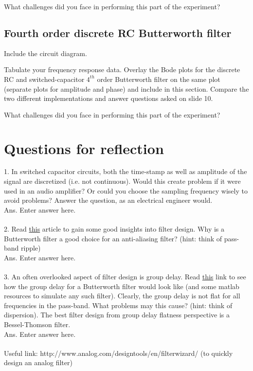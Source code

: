 \documentclass[12pt]{article}
\begin{document}
What challenges did you face in performing this part of the experiment?

\subsection{Fourth order discrete RC Butterworth filter}

Include the circuit diagram.

Tabulate your frequency response data. Overlay the Bode plots for the discrete RC and switched-capacitor $4^{th}$ order Butterworth filter on the same plot (separate plots for amplitude and phase) and include in this section. Compare the two different implementations and answer questions asked on slide 10.

What challenges did you face in performing this part of the experiment?

\section{Questions for reflection}

1. In switched capacitor circuits, both the time-stamp as well as amplitude of the signal are discretized (i.e. not continuous). Would this create problem if it were used in an audio amplifier? Or could you choose the sampling frequency wisely to avoid problems? Answer the question, as an electrical engineer would.\\
Ans. Enter answer here.
\\\\
2. Read \href{http://www.analog.com/en/analog-dialogue/articles/practical-filter-design-precision-adcs.html}{this} article to gain some good insights into filter design. Why is a Butterworth filter a good choice for an anti-aliasing filter? (hint: think of pass-band ripple)\\
Ans. Enter answer here.
\\\\
3. An often overlooked aspect of filter design is group delay. Read \href{http://in.mathworks.com/help/signal/ref/grpdelay.html#bt6hrjd}{this} link to see how the group delay for a Butterworth filter would look like (and some matlab resources to simulate any such filter). Clearly, the group delay is not flat for all frequencies in the pass-band. What problems may this cause? (hint: think of dispersion). The best filter design from group delay flatness perspective is a Bessel-Thomson filter.\\
Ans. Enter answer here.
\\\\
Useful link: http://www.analog.com/designtools/en/filterwizard/ (to quickly design an analog filter)
\end{document}
